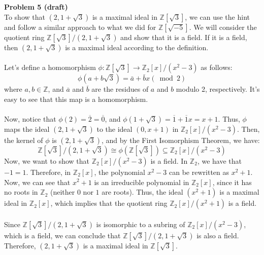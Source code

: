 \documentclass{article}
\begin{document}
\noindent \textbf{Problem 5 (draft)} \\
To show that $(2,1+\sqrt{3})$ is a maximal ideal in $\mathbb{Z}[\sqrt{3}]$, we can use the hint and follow a similar approach to what we did for $\mathbb{Z}[\sqrt{-5}]$. We will consider the quotient ring $\mathbb{Z}[\sqrt{3}]/(2,1+\sqrt{3})$ and show that it is a field. If it is a field, then $(2,1+\sqrt{3})$ is a maximal ideal according to the definition.\\\\
Let's define a homomorphism $\phi: \mathbb{Z}[\sqrt{3}] \to \mathbb{Z}_2[x]/(x^2-3)$ as follows:
$$
\phi(a+b \sqrt{3})=\bar{a}+\bar{b} x(\bmod 2)
$$
where $a,b \in \mathbb{Z}$, and $\overline{a}$ and $\overline{b}$ are the residues of $a$ and $b$ modulo 2, respectively. It's easy to see that this map is a homomorphism.\\\\
Now, notice that $\phi(2)=\overline{2}=\overline{0}$, and $\phi(1+\sqrt{3})=\overline{1}+\overline{1}x=x+1$. Thus, $\phi$ maps the ideal $(2,1+\sqrt{3})$ to the ideal $(0, x+1)$ in $\mathbb{Z}_2[x]/(x^2-3)$. Then, the kernel of $\phi$ is $(2,1+\sqrt{3})$, and by the First Isomorphism Theorem, we have:
$$
\mathbb{Z}[\sqrt{3}] /(2,1+\sqrt{3}) \cong \phi(\mathbb{Z}[\sqrt{3}]) \subseteq \mathbb{Z}_2[x] /\left(x^2-3\right)
$$
Now, we want to show that $\mathbb{Z}_2[x]/(x^2-3)$ is a field. In $\mathbb{Z}_2$, we have that $-1 = 1$. Therefore, in $\mathbb{Z}_2[x]$, the polynomial $x^2-3$ can be rewritten as $x^2+1$. Now, we can see that $x^2+1$ is an irreducible polynomial in $\mathbb{Z}_2[x]$, since it has no roots in $\mathbb{Z}_2$ (neither $0$ nor $1$ are roots). Thus, the ideal $(x^2+1)$ is a maximal ideal in $\mathbb{Z}_2[x]$, which implies that the quotient ring $\mathbb{Z}_2[x]/(x^2+1)$ is a field.\\\\
Since $\mathbb{Z}[\sqrt{3}]/(2,1+\sqrt{3})$ is isomorphic to a subring of $\mathbb{Z}_2[x]/(x^2-3)$, which is a field, we can conclude that $\mathbb{Z}[\sqrt{3}]/(2,1+\sqrt{3})$ is also a field. Therefore, $(2,1+\sqrt{3})$ is a maximal ideal in $\mathbb{Z}[\sqrt{3}]$.\\\\
\end{document}
